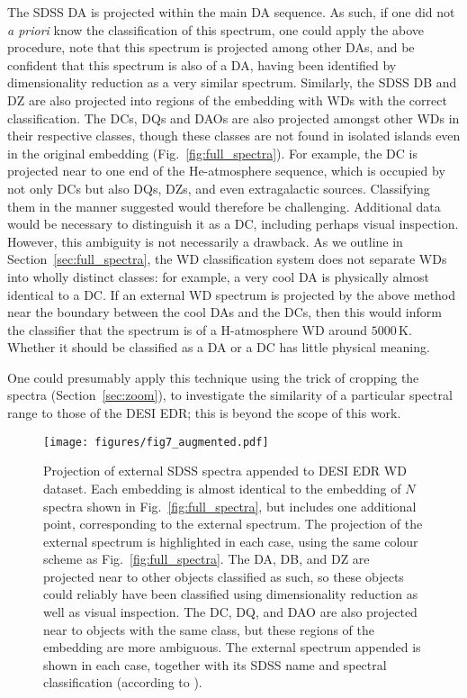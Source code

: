 \documentclass[fleqn,usenatbib]{mnras}
\begin{document}
The SDSS DA is projected within the main DA sequence.
As such, if one did not \textit{a priori} know the classification of this spectrum, one could apply the above procedure, note that this spectrum is projected among other DAs, and be confident that this spectrum is also of a DA, having been identified by dimensionality reduction as a very similar spectrum.
Similarly, the SDSS DB and DZ are also projected into regions of the embedding with WDs with the correct classification.
The DCs, DQs and DAOs are also projected amongst other WDs in their respective classes, though these classes are not found in isolated islands even in the original embedding (Fig.~\ref{fig:full_spectra}).
For example, the DC is projected near to one end of the He-atmosphere sequence, which is occupied by not only DCs but also DQs, DZs, and even extragalactic sources.
Classifying them in the manner suggested would therefore be challenging.
Additional data would be necessary to distinguish it as a DC, including perhaps visual inspection.
However, this ambiguity is not necessarily a drawback.
As we outline in Section~\ref{sec:full_spectra}, the WD classification system does not separate WDs into wholly distinct classes: for example, a very cool DA is physically almost identical to a DC.
If an external WD spectrum is projected by the above method near the boundary between the cool DAs and the DCs, then this would inform the classifier that the spectrum is of a H-atmosphere WD around $5000\,\text{K}$.
Whether it should be classified as a DA or a DC has little physical meaning.

One could presumably apply this technique using the trick of cropping the spectra (Section~\ref{sec:zoom}), to investigate the similarity of a particular spectral range to those of the DESI EDR; this is beyond the scope of this work.

\begin{figure*}
\texttt{[image: figures/fig7\_augmented.pdf]}
\caption{
    Projection of external SDSS spectra appended to DESI EDR WD dataset.
    Each embedding is almost identical to the embedding of $N$ spectra shown in Fig.~\ref{fig:full_spectra}, but includes one additional point, corresponding to the external spectrum.
    The projection of the external spectrum is highlighted in each case, using the same colour scheme as Fig.~\ref{fig:full_spectra}.
    The DA, DB, and DZ are projected near to other objects classified as such, so these objects could reliably have been classified using dimensionality reduction as well as visual inspection.
    The DC, DQ, and DAO are also projected near to objects with the same class, but these regions of the embedding are more ambiguous.
    The external spectrum appended is shown in each case, together with its SDSS name and spectral classification (according to \citealt{gentilefusillo19}).
}
\label{fig:external_spectra}
\end{figure*}
\end{document}
